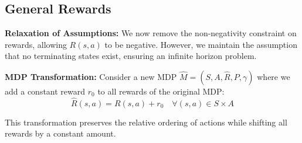 \documentclass[12pt]{article}
\begin{document}
   \subsection{General Rewards}
\label{subsec:general_rewards}

\textbf{Relaxation of Assumptions:} We now remove the non-negativity constraint on rewards, allowing \( R(s, a) \) to be negative. However, we maintain the assumption that no terminating states exist, ensuring an infinite horizon problem.

\textbf{MDP Transformation:} Consider a new MDP \( \hat{M} = (S, A, \hat{R}, P, \gamma) \) where we add a constant reward \( r_0 \) to all rewards of the original MDP:
\begin{equation}
\hat{R}(s, a) = R(s, a) + r_0 \quad \forall (s, a) \in S \times A
\end{equation}

This transformation preserves the relative ordering of actions while shifting all rewards by a constant amount.
    
\end{document}
